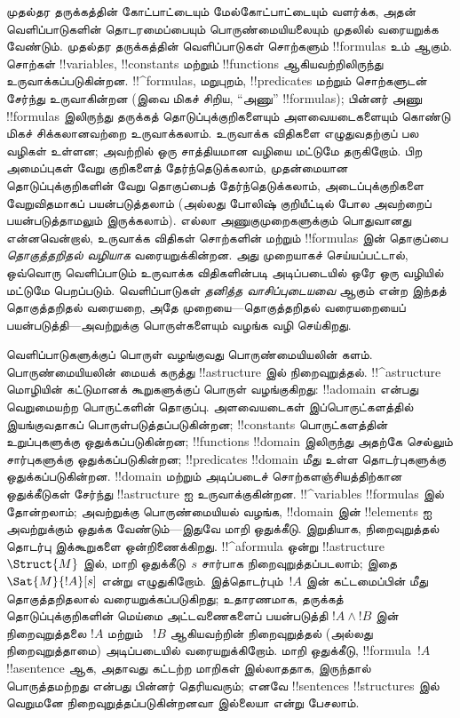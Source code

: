 \documentclass[../../../include/open-logic-section]{subfiles}
\begin{document}


முதல்தர தருக்கத்தின் கோட்பாட்டையும் மேல்கோட்பாட்டையும் வளர்க்க, அதன்
வெளிப்பாடுகளின் தொடரமைப்பையும் பொருண்மையியலையும் முதலில் வரையறுக்க வேண்டும்.
முதல்தர தருக்கத்தின் வெளிப்பாடுகள் சொற்களும் !!{formula}s உம் ஆகும். சொற்கள்
!!{variable}s, !!{constant}s மற்றும் !!{function}s ஆகியவற்றிலிருந்து
உருவாக்கப்படுகின்றன. !!^{formula}s, மறுபுறம், !!{predicate}s மற்றும் சொற்களுடன்
சேர்ந்து உருவாகின்றன (இவை மிகச் சிறிய, ``அணு'' !!{formula}s); பின்னர் அணு
!!{formula}s இலிருந்து தருக்கத் தொடுப்புக்குறிகளையும் அளவையடைகளையும் கொண்டு
மிகச் சிக்கலானவற்றை உருவாக்கலாம். உருவாக்க விதிகளை எழுதுவதற்குப் பல வழிகள்
உள்ளன; அவற்றில் ஒரு சாத்தியமான வழியை மட்டுமே தருகிறோம். பிற அமைப்புகள்
வேறு குறிகளைத் தேர்ந்தெடுக்கலாம், முதன்மையான தொடுப்புக்குறிகளின் வேறு
தொகுப்பைத் தேர்ந்தெடுக்கலாம், அடைப்புக்குறிகளை வேறுவிதமாகப் பயன்படுத்தலாம்
(அல்லது போலிஷ் குறியீட்டில் போல அவற்றைப் பயன்படுத்தாமலும் இருக்கலாம்).
எல்லா அணுகுமுறைகளுக்கும் பொதுவானது என்னவென்றால், உருவாக்க விதிகள் சொற்களின்
மற்றும் !!{formula}s இன் தொகுப்பை \emph{தொகுத்தறிதல் வழியாக} வரையறுக்கின்றன.
அது முறையாகச் செய்யப்பட்டால், ஒவ்வொரு வெளிப்பாடும் உருவாக்க விதிகளின்படி
அடிப்படையில் ஒரே ஒரு வழியில் மட்டுமே பெறப்படும். வெளிப்பாடுகள்
\emph{தனித்த வாசிப்புடையவை} ஆகும் என்ற இந்தத் தொகுத்தறிதல் வரையறை,
அதே முறையை---தொகுத்தறிதல் வரையறையைப் பயன்படுத்தி---அவற்றுக்கு
பொருள்களையும் வழங்க வழி செய்கிறது.

வெளிப்பாடுகளுக்குப் பொருள் வழங்குவது பொருண்மையியலின் களம். பொருண்மையியலின்
மையக் கருத்து !!a{structure} இல் நிறைவுறுத்தல். !!^a{structure} மொழியின்
கட்டுமானக் கூறுகளுக்குப் பொருள் வழங்குகிறது: !!a{domain} என்பது வெறுமையற்ற
பொருட்களின் தொகுப்பு. அளவையடைகள் இப்பொருட்களத்தில் இயங்குவதாகப்
பொருள்படுத்தப்படுகின்றன; !!{constant}s பொருட்களத்தின் உறுப்புகளுக்கு
ஒதுக்கப்படுகின்றன; !!{function}s !!{domain} இலிருந்து அதற்கே செல்லும்
சார்புகளுக்கு ஒதுக்கப்படுகின்றன; !!{predicate}s !!{domain} மீது உள்ள
தொடர்புகளுக்கு ஒதுக்கப்படுகின்றன. !!{domain} மற்றும் அடிப்படைச்
சொற்களஞ்சியத்திற்கான ஒதுக்கீடுகள் சேர்ந்து !!a{structure} ஐ உருவாக்குகின்றன.
!!^{variable}s !!{formula}s இல் தோன்றலாம்; அவற்றுக்கு பொருண்மையியல்
வழங்க, !!{domain} இன் !!{element}s ஐ அவற்றுக்கும் ஒதுக்க வேண்டும்---இதுவே
மாறி ஒதுக்கீடு. இறுதியாக, நிறைவுறுத்தல் தொடர்பு இக்கூறுகளை ஒன்றிணைக்கிறது.
!!^a{formula} ஒன்று !!a{structure}~$\Struct{M}$ இல்,
மாறி ஒதுக்கீடு~$s$ சார்பாக நிறைவுறுத்தப்படலாம்; இதை
$\Sat{M}{!A}[s]$ என்று எழுதுகிறோம். இத்தொடர்பும்~$!A$ இன் கட்டமைப்பின்
மீது தொகுத்தறிதலால் வரையறுக்கப்படுகிறது; உதாரணமாக, தருக்கத் தொடுப்புக்குறிகளின்
மெய்மை அட்டவணைகளைப் பயன்படுத்தி $!A \land !B$ இன் நிறைவுறுத்தலை
$!A$ மற்றும் ~$!B$ ஆகியவற்றின் நிறைவுறுத்தல் (அல்லது நிறைவுறுத்தாமை) அடிப்படையில்
வரையறுக்கிறோம். மாறி ஒதுக்கீடு, !!{formula}~$!A$
!!a{sentence} ஆக, அதாவது கட்டற்ற மாறிகள் இல்லாததாக, இருந்தால் பொருத்தமற்றது
என்பது பின்னர் தெரியவரும்; எனவே !!{sentence}s !!{structure}s இல்
வெறுமனே நிறைவுறுத்தப்படுகின்றனவா இல்லையா என்று பேசலாம்.
\end{document}
